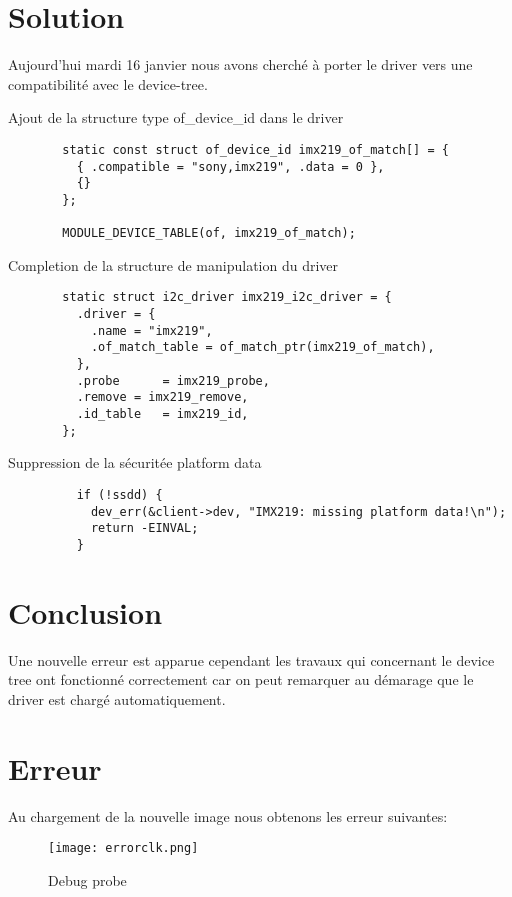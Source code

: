 \section{Solution}
Aujourd'hui mardi 16 janvier nous avons cherché à porter le driver vers
une compatibilité avec le device-tree.
\begin{description}

  \item[Ajout de la structure type of\_device\_id dans le driver]

  \begin{lstlisting}
  static const struct of_device_id imx219_of_match[] = {
    { .compatible = "sony,imx219", .data = 0 },
    {}
  };

  MODULE_DEVICE_TABLE(of, imx219_of_match);
  \end{lstlisting}

  \item[Completion de la structure de manipulation du driver]

  \begin{lstlisting}
  static struct i2c_driver imx219_i2c_driver = {
    .driver = {
      .name = "imx219",
      .of_match_table = of_match_ptr(imx219_of_match),
    },
    .probe		= imx219_probe,
    .remove	= imx219_remove,
    .id_table	= imx219_id,
  };
  \end{lstlisting}

  \item[Suppression de la sécuritée platform data]
  \begin{lstlisting}
    if (!ssdd) {
      dev_err(&client->dev, "IMX219: missing platform data!\n");
      return -EINVAL;
    }
    \end{lstlisting}
\end{description}

\section{Conclusion}
Une nouvelle erreur est apparue cependant les travaux qui concernant le 
device tree ont fonctionné correctement car on peut remarquer au démarage
que le driver est chargé automatiquement.

\section{Erreur}
Au chargement de la nouvelle image nous obtenons les erreur suivantes:

\begin{figure}[th]
  \centering
  \texttt{[image: errorclk.png]}
  \decoRule
  \caption{Debug probe}  \label{fig:planning}
\end{figure}

